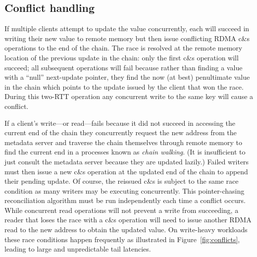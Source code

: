 \subsection{Conflict handling}

If multiple clients attempt to update the value concurrently, each
will succeed in writing their new value to remote memory but then
issue conflicting RDMA c\&s operations to the end of the chain.  The
race is resolved at the remote memory location of the previous update
in the chain: only the first c\&s operation will succeed; all
subsequent operations will fail because rather than finding a value
with a ``null'' next-update pointer, they find the now (at best)
penultimate value in the chain which points to the update issued by
the client that won the race.
During this
two-RTT operation any concurrent write to the same key will cause a
conflict.



If a client's write---or read---fails because it did not succeed in
accessing the current end of the chain they concurrently request the
new address from the metadata server and traverse the chain themselves
through remote memory to find the current end in a processes known as
\emph{chain walking}.  (It is insufficient to just consult the
metadata server because they are updated lazily.)  Failed writers must
then issue a new c\&s operation at the updated end of the chain to append
their pending update.  Of course, the reissued c\&s is subject to the
same race condition as many writers may be executing
concurrently. This pointer-chasing reconciliation algorithm must be
run independently each time a conflict occurs.
While concurrent read operations will not prevent a write from
succeeding, a reader that loses the race with a c\&s operation will
need to issue another RDMA read to the new address to obtain the
updated value.  On write-heavy workloads these race conditions happen
frequently as illustrated in Figure~\ref{fig:conflicts},
leading to large and unpredictable tail latencies.




